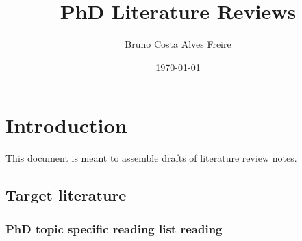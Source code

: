 \documentclass{article}
\title{PhD Literature Reviews}
\author{Bruno Costa Alves Freire}
\date{\today}
\begin{document}
\maketitle

\section{Introduction}

This document is meant to assemble drafts of literature review notes. 

\subsection{Target literature}
\subsubsection{PhD topic specific reading list reading}
\end{document}
